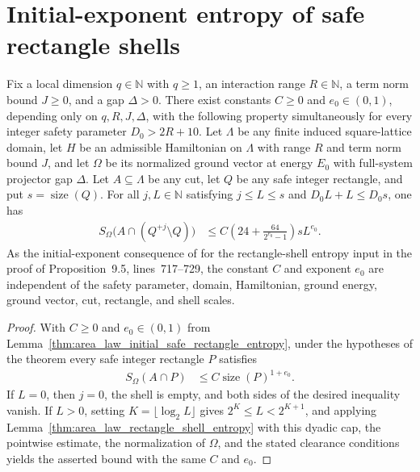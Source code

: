 \section{Initial-exponent entropy of safe rectangle shells}

\begin{lemma}
    \label{thm:area_law_initial_rectangle_shell_entropy}
    \leanok
    Fix a local dimension $q\in\mathbb N$ with $q\ge1$, an interaction
    range $R\in\mathbb N$, a term norm bound $J\ge0$, and a gap
    $\Delta>0$. There exist constants $C\ge0$ and $e_0\in(0,1)$,
    depending only on $q,R,J,\Delta$, with the following property
    simultaneously for every integer safety parameter $D_0>2R+10$.
    Let $\Lambda$ be any finite induced square-lattice domain, let $H$
    be an admissible Hamiltonian on $\Lambda$ with range $R$ and term
    norm bound $J$, and let $\Omega$ be its normalized ground vector
    at energy $E_0$ with full-system projector gap $\Delta$.
    Let $A\subseteq\Lambda$ be any cut, let $Q$ be any safe integer
    rectangle, and put $s=\operatorname{size}(Q)$. For all
    $j,L\in\mathbb N$ satisfying $j\le L\le s$ and
    $D_0L+L\le D_0s$, one has
    \begin{align}
        S_\Omega\bigl(A\cap(Q^{+j}\setminus Q)\bigr)
         & \le C\left(24+\frac{64}{2^{e_0}-1}\right)sL^{e_0}.
    \end{align}
    As the initial-exponent
    consequence of \cite[Proposition~3.3, lines~590--604]{OpenAI2026AreaLaw}
    for the rectangle-shell entropy input in the proof of
    Proposition~9.5, lines~717--729, the constant $C$ and exponent $e_0$ are
    independent of the safety
    parameter, domain, Hamiltonian, ground energy, ground vector, cut,
    rectangle, and shell scales.
\end{lemma}
\begin{proof}
    \leanok
    With $C\ge0$ and $e_0\in(0,1)$ from
    Lemma~\ref{thm:area_law_initial_safe_rectangle_entropy},
    under the hypotheses of the theorem every safe integer rectangle $P$
    satisfies
    \begin{align}
        S_\Omega(A\cap P)
         & \le C\operatorname{size}(P)^{1+e_0}.
    \end{align}
    If $L=0$, then $j=0$, the shell is empty, and both sides of the
    desired inequality vanish. If $L>0$, setting
    $K=\lfloor\log_2L\rfloor$ gives $2^K\le L<2^{K+1}$, and
    applying Lemma~\ref{thm:area_law_rectangle_shell_entropy} with this
    dyadic cap, the pointwise estimate, the normalization of $\Omega$,
    and the stated clearance conditions yields the asserted bound with
    the same $C$ and $e_0$.
\end{proof}
